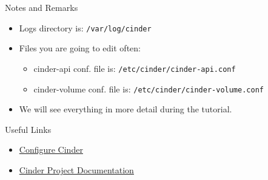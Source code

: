 \documentclass[english,serif,mathserif]{beamer}
\begin{document}
\begin{frame}{Notes and Remarks}

\begin{itemize}
\item Logs directory is: \texttt{/var/log/cinder}
\item Files you are going to edit often:
      \begin{itemize}
        \item cinder-api conf. file is: \texttt{/etc/cinder/cinder-api.conf}
        \item cinder-volume conf. file is: \texttt{/etc/cinder/cinder-volume.conf}
      \end{itemize}
\item We will see everything in more detail during the tutorial.
\end{itemize}

\end{frame}

\begin{frame}{Useful Links}

\begin{itemize}
\item \href{http://docs.openstack.org/icehouse/install-guide/install/apt/content/ch\_cinder.html}{Configure Cinder}
\item \href{https://wiki.openstack.org/wiki/Cinder}{Cinder Project Documentation}
\end{itemize}

\end{frame}
\end{document}
